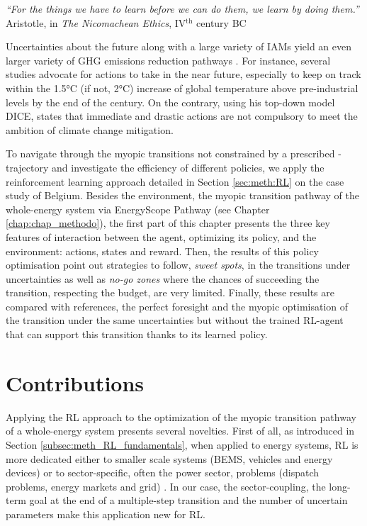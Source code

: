 \vspace{-0.2cm}
\begin{flushright}
\emph{``For the things we have to learn before we can do them, we learn by doing them.''}\\
Aristotle, in \textit{The Nicomachean Ethics}, IV$^\text{th}$ century BC
\end{flushright}
\vspace{0.4cm}

Uncertainties about the future along with a large variety of \gls{IAMs} yield an even larger variety of \gls{GHG} emissions reduction pathways \cite{nicolas2021robust}. For instance, several studies \cite{IPCC_CO2_budget,steffen2018trajectories} advocate for actions to take in the near future, especially to keep on track within the 1.5°C (if not, 2°C) increase of global temperature above pre-industrial levels by the end of the century. On the contrary, using his top-down model DICE, \citet{nordhaus2014question} states that immediate and drastic actions are not compulsory to meet the ambition of climate change mitigation. 

To navigate through the myopic transitions not constrained by a prescribed -trajectory and investigate the efficiency of different policies, we apply the reinforcement learning approach detailed in Section \ref{sec:meth:RL} on the case study of Belgium. Besides the environment, \ie the myopic transition pathway of the whole-energy system via EnergyScope Pathway (see Chapter \ref{chap:chap_methodo}), the first part of this chapter presents the three key features of interaction between the agent, optimizing its policy, and the environment: actions, states and reward.  Then, the results of this policy optimisation point out strategies to follow, \ie \textit{sweet spots}, in the transitions under uncertainties as well as \textit{no-go zones} where the chances of succeeding the transition, \ie respecting the  budget, are very limited. Finally, these results are compared with references, \ie the perfect foresight and the myopic optimisation of the transition under the same uncertainties but without the trained \gls{RL}-agent that can support this transition thanks to its learned policy.

\section*{Contributions}
\label{sec:RL:contributions}
Applying the \gls{RL} approach to the optimization of the myopic transition pathway of a whole-energy system presents several novelties. First of all, as introduced in Section \ref{subsec:meth_RL_fundamentals}, when applied to energy systems, \gls{RL} is more dedicated either to smaller scale systems (\eg \gls{BEMS}, vehicles and energy devices) or to sector-specific, often the power sector, problems (\eg dispatch problems, energy markets and grid) \cite{perera2021applications}. In our case, the sector-coupling, the long-term goal at the end of a multiple-step transition and the number of uncertain parameters make this application new for \gls{RL}.

